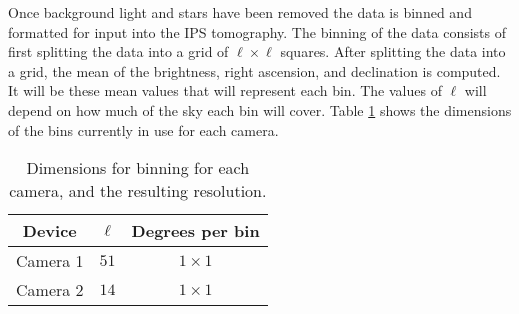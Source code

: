 Once background light and stars have been removed the data is binned and formatted for input into the IPS tomography. The binning of the data consists of first splitting the data into a grid of $\ell \times \ell$ squares. After splitting the data into a grid, the mean of the brightness, right ascension, and declination is computed. It will be these mean values that will represent each bin. The values of $\ell$ will depend on how much of the sky each bin will cover. Table \ref{tbl_bin_dimensions} shows the dimensions of the bins currently in use for each camera.
\begin{table}[h]
  \center
  \begin{tabular}{|c|c|c|}
    \hline 
    \rule[-1ex]{0pt}{2.5ex} Device & $\ell$ & Degrees per bin  \\ 
    \hline 
    \rule[-1ex]{0pt}{2.5ex} Camera 1 & $51$ & $1 \times 1$  \\ 
    \hline 
    \rule[-1ex]{0pt}{2.5ex} Camera 2 & $14$  & $1 \times 1$ \\ 
    \hline 
  \end{tabular} 
  \caption{Dimensions for binning for each camera, and the resulting resolution.}
  \label{tbl_bin_dimensions}
\end{table}